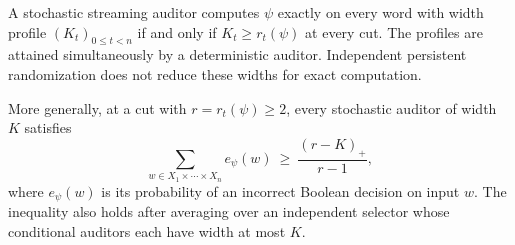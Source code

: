 \begin{theorem}
\label{thm:v19-residual}
A stochastic streaming auditor computes $\psi$ exactly on every word with
width profile $(K_t)_{0\le t<n}$ if and only if
$K_t\ge r_t(\psi)$ at every cut. The profiles are attained simultaneously
by a deterministic auditor. Independent persistent randomization does not
reduce these widths for exact computation.

More generally, at a cut with $r=r_t(\psi)\ge2$, every stochastic auditor
of width $K$ satisfies
\begin{equation}\label{eq:v19-cuterror}
 \sum_{w\in X_1\times\cdots\times X_n}
       e_\psi(w)\ \ge\ \frac{(r-K)_+}{r-1},
\end{equation}
where $e_\psi(w)$ is its probability of an incorrect Boolean decision on
input $w$. The inequality also holds after averaging over an independent
selector whose conditional auditors each have width at most $K$.
\end{theorem}

